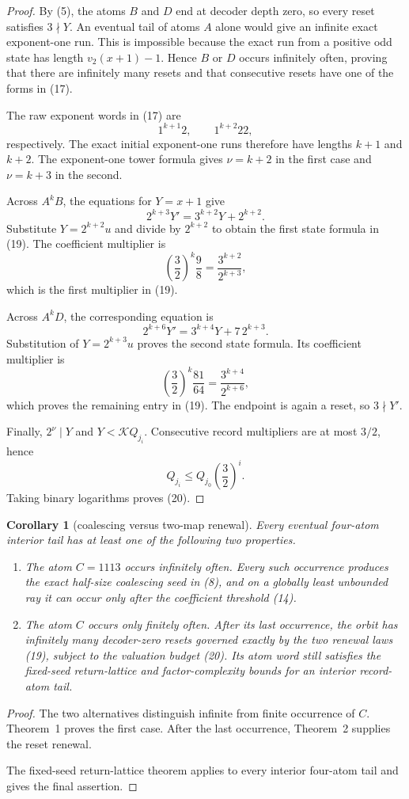 \documentclass[11pt]{article}
\newtheorem{corollary}[theorem]{Corollary}
\begin{document}
\begin{proof}
By (5), the atoms $B$ and $D$ end at decoder depth zero, so every reset
satisfies $3\nmid Y$.  An eventual tail of atoms $A$ alone would give an
infinite exact exponent-one run.  This is impossible because the exact
run from a positive odd state has length $v_2(x+1)-1$.  Hence $B$ or $D$
occurs infinitely often, proving that there are infinitely many resets and
that consecutive resets have one of the forms in (17).

The raw exponent words in (17) are
\[
 1^{k+1}2,
 \qquad
 1^{k+2}22,
 \tag{21}
\]
respectively.  The exact initial exponent-one runs therefore have lengths
$k+1$ and $k+2$.  The exponent-one tower formula gives
$\nu=k+2$ in the first case and $\nu=k+3$ in the second.

Across $A^kB$, the equations for $Y=x+1$ give
\[
 2^{k+3}Y'=3^{k+2}Y+2^{k+2}.
 \tag{22}
\]
Substitute $Y=2^{k+2}u$ and divide by $2^{k+2}$ to obtain the first state
formula in (19).  The coefficient multiplier is
\[
 \left(\frac32\right)^k\frac98
 =\frac{3^{k+2}}{2^{k+3}},
\]
which is the first multiplier in (19).

Across $A^kD$, the corresponding equation is
\[
 2^{k+6}Y'=3^{k+4}Y+7\,2^{k+3}.
 \tag{23}
\]
Substitution of $Y=2^{k+3}u$ proves the second state formula.  Its
coefficient multiplier is
\[
 \left(\frac32\right)^k\frac{81}{64}
 =\frac{3^{k+4}}{2^{k+6}},
\]
which proves the remaining entry in (19).  The endpoint is again a reset,
so $3\nmid Y'$.

Finally, $2^\nu\mid Y$ and $Y<\mathcal KQ_{j_i}$.  Consecutive record
multipliers are at most $3/2$, hence
\[
 Q_{j_i}\leq Q_{j_0}\left(\frac32\right)^i.
\]
Taking binary logarithms proves (20).
\end{proof}

\begin{corollary}[coalescing versus two-map renewal]
Every eventual four-atom interior tail has at least one of the following
two properties.
\begin{enumerate}
 \item The atom $C=1113$ occurs infinitely often.  Every such occurrence
 produces the exact half-size coalescing seed in (8), and on a globally
 least unbounded ray it can occur only after the coefficient threshold
 (14).
 \item The atom $C$ occurs only finitely often.  After its last occurrence,
 the orbit has infinitely many decoder-zero resets governed exactly by the
 two renewal laws (19), subject to the valuation budget (20).  Its atom
 word still satisfies the fixed-seed return-lattice and factor-complexity
 bounds for an interior record-atom tail.
\end{enumerate}
\end{corollary}

\begin{proof}
The two alternatives distinguish infinite from finite occurrence of
$C$.  Theorem~1 proves the first case.  After the last occurrence,
Theorem~2 supplies the reset renewal.

The fixed-seed return-lattice theorem applies to every interior
four-atom tail and gives the final assertion.
\end{proof}
\end{document}
